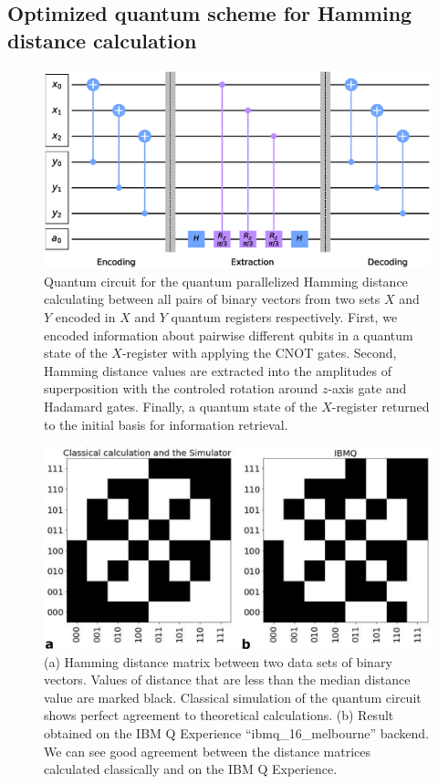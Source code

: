 \documentclass[pra,showkeys,twocolumn,showpacs]{revtex4-1}
\begin{document}
\subsection{Optimized quantum scheme for Hamming distance calculation}
\label{subsec:qcircuit}


\begin{figure}[t]
	\includegraphics[width=\columnwidth]{qcircuit.eps}
	\caption{
		Quantum circuit for the quantum parallelized Hamming distance calculating  between all pairs of binary vectors from two sets ${X}$ and ${Y}$ encoded \cite{trugenberger2001} in $X$ and $Y$ quantum registers   respectively.
		First, we encoded information about pairwise different qubits in a quantum state of the $X$-register with applying the CNOT gates. 
		Second, Hamming distance values are extracted into the amplitudes of superposition with the controled rotation around $z$-axis gate and Hadamard gates. 
		Finally, a quantum state of the $X$-register returned to the initial basis for information retrieval. 	
	} 
	\label{fig:qcircuit}
\end{figure}



\begin{figure}[t]
	\includegraphics[width=0.95\columnwidth]{distance_matrix.png}
	\caption{
		(a) Hamming distance matrix between two data sets of binary vectors. 
		Values of distance that are less than the median distance value are marked black. 
		Classical simulation of the quantum circuit shows perfect agreement to theoretical calculations. 
		(b) Result obtained on the IBM Q Experience ``ibmq\_16\_melbourne'' backend. 
		We can see good agreement between the distance matrices calculated classically and on the IBM Q Experience.  
	}
	\label{fig:distance_matrix}
\end{figure}
\end{document}
